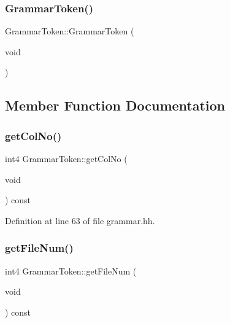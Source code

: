 \subsubsection{\texorpdfstring{GrammarToken()}{GrammarToken()}}
{\footnotesize\ttfamily Grammar\+Token\+::\+Grammar\+Token (\begin{DoxyParamCaption}\item[{void}]{ }\end{DoxyParamCaption})}



\subsection{Member Function Documentation}
\mbox{\label{class_grammar_token_a44af9bd3befd865332ea8361a14a559e}} 
\subsubsection{\texorpdfstring{getColNo()}{getColNo()}}
{\footnotesize\ttfamily int4 Grammar\+Token\+::get\+Col\+No (\begin{DoxyParamCaption}\item[{void}]{ }\end{DoxyParamCaption}) const\hspace{0.3cm}{\ttfamily [inline]}}



Definition at line 63 of file grammar.\+hh.

\mbox{\label{class_grammar_token_abb2087b33e420d4cdbd10478b58a7021}} 
\subsubsection{\texorpdfstring{getFileNum()}{getFileNum()}}
{\footnotesize\ttfamily int4 Grammar\+Token\+::get\+File\+Num (\begin{DoxyParamCaption}\item[{void}]{ }\end{DoxyParamCaption}) const\hspace{0.3cm}{\ttfamily [inline]}}



